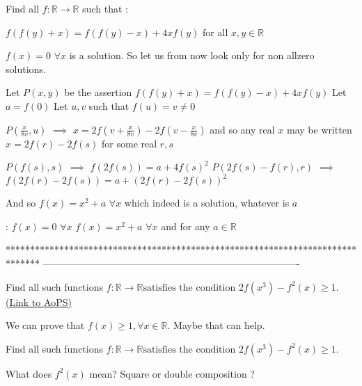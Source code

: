 \begin{solution}
	\begin{tcolorbox}Find all $f : \mathbb{R} \rightarrow \mathbb{R}$ such that :

$f(f(y) + x) = f(f(y) - x) + 4xf(y)$ for all $x, y \in \mathbb{R}$\end{tcolorbox}
$f(x)=0$ $\forall x$ is a solution. So let us from now look only for non allzero solutions.

Let $P(x,y)$ be the assertion $f(f(y)+x)=f(f(y)-x)+4xf(y)$
Let $a=f(0)$
Let $u,v$ such that $f(u)=v\ne 0$

$P(\frac x{8v},u)$ $\implies$ $x=2f(v+\frac x{8v})-2f(v-\frac x{8v})$ and so any real $x$ may be written $x=2f(r)-2f(s)$ for some real $r,s$

$P(f(s),s)$ $\implies$ $f(2f(s))=a+4f(s)^2$
$P(2f(s)-f(r),r)$ $\implies$ $f(2f(r)-2f(s))=a+(2f(r)-2f(s))^2$

And so $f(x)=x^2+a$ $\forall x$ which indeed is a solution, whatever is $a$

 :
$f(x)=0$ $\forall x$
$f(x)=x^2+a$ $\forall x$ and for any $a\in\mathbb R$
\end{solution}
*******************************************************************************
-------------------------------------------------------------------------------

\begin{problem}
	Find all such functions $f:\mathbb{R} \to \mathbb{R} \text{satisfies the condition}$  $2f(x^3)-f^2(x)\geq 1$.
	\flushright \href{https://artofproblemsolving.com/community/c6h485220}{(Link to AoPS)}
\end{problem}



\begin{solution}
	We can prove that $f(x)\geq 1,\forall x\in\mathbb{R}$. Maybe that can help.
\end{solution}



\begin{solution}
	\begin{tcolorbox}Find all such functions $f:\mathbb{R} \to \mathbb{R} \text{satisfies the condition}$  $2f(x^3)-f^2(x)\geq 1$.\end{tcolorbox}
What does $f^2(x)$ mean? Square or double composition ?
\end{solution}



